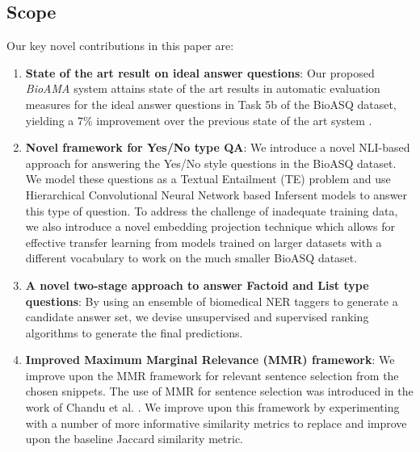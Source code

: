 \subsection{Scope}

Our key novel contributions in this paper are:
\begin{enumerate}
    \item \textbf{State of the art result on ideal answer questions}: Our proposed \textit{BioAMA} system attains state of the art results in automatic evaluation measures for the ideal answer questions in Task 5b of the BioASQ dataset, yielding a 7\%  improvement over the previous state of the art system \cite{khyati-paper}.
    \item \textbf{Novel framework for Yes/No type QA}: 
    We introduce a novel NLI-based approach for answering the Yes/No style questions in the BioASQ dataset. We model these questions as a Textual Entailment (TE) problem and use Hierarchical Convolutional Neural Network based Infersent models \cite{Infersent} to answer this type of question. To address the challenge of inadequate training data, we also introduce a novel embedding projection technique which allows for effective transfer learning from models trained on larger datasets with a different vocabulary to work on the much smaller BioASQ dataset.
    \item \textbf{A novel two-stage approach to answer Factoid and List type questions}: 
    By using an ensemble of biomedical NER taggers to generate a candidate answer set, we devise unsupervised and supervised ranking algorithms to generate the final predictions.
    \item \textbf{Improved Maximum Marginal Relevance (MMR) framework}: We improve upon the MMR framework for relevant sentence selection from the chosen snippets. The use of MMR for sentence selection was introduced in the work of Chandu et al. . We improve upon this framework by experimenting with a number of more informative similarity metrics to replace and improve upon the baseline Jaccard similarity metric.

\end{enumerate}

